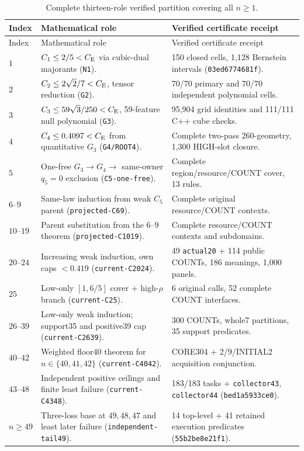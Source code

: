 \begin{center}\small
\begin{longtable}{@{}P{0.10\textwidth}P{0.44\textwidth}P{0.38\textwidth}@{}}
\caption{Complete thirteen-role verified partition covering all $n\ge1$.}
\label{ms:tab:roles}\\\toprule
Index & Mathematical role & Verified certificate receipt\\\midrule
\endfirsthead\toprule
Index & Mathematical role & Verified certificate receipt\\\midrule\endhead
$1$ & $C_1\le2/5<C_{\mathrm E}$ via cubic-dual majorants (\texttt{N1}). & 150 closed cells, 1,128 Bernstein intervals (\texttt{03ed6774681f}).\\
$2$ & $C_2\le2\sqrt2/7<C_{\mathrm E}$, tensor reduction (\texttt{G2}). & 70/70 primary and 70/70 independent polynomial cells.\\
$3$ & $C_3\le59\sqrt3/250<C_{\mathrm E}$, 59-feature null polynomial (\texttt{G3}). & 95,904 grid identities and 111/111 C++ cube checks.\\
$4$ & $C_4\le0.4097<C_{\mathrm E}$ from quantitative $G_3$ (\texttt{G4/ROOT4}). & Complete two-pass 260-geometry, 1,300 HIGH-slot closure.\\
$5$ & One-free $G_3\to G_4\to$ same-owner $q_5=0$ exclusion (\texttt{C5-one-free}). & Complete region/resource/COUNT cover, 13 rules.\\
$6$--$9$ & Same-law induction from weak $C_5$ parent (\texttt{projected-C69}). & Complete original resource/COUNT contexts.\\
$10$--$19$ & Parent substitution from the $6$--$9$ theorem (\texttt{projected-C1019}). & Complete resource/COUNT contexts and subdomains.\\
$20$--$24$ & Increasing weak induction, own caps $<0.419$ (\texttt{current-C2024}). & 49 \texttt{actual20} + 114 public COUNTs, 186 meanings, 1,000 panels.\\
$25$ & Low-only $[1,6/5]$ cover + high-$\rho$ branch (\texttt{current-C25}). & 6 original calls, 52 complete COUNT interfaces.\\
$26$--$39$ & Low-only weak induction; support35 and positive39 cap (\texttt{current-C2639}). & 300 COUNTs, whole7 partitions, 35 support predicates.\\
$40$--$42$ & Weighted floor40 theorem for $n\in\{40,41,42\}$ (\texttt{current-C4042}). & CORE304 + 2/9/INITIAL2 acquisition conjunction.\\
$43$--$48$ & Independent positive ceilings and finite least failure (\texttt{current-C4348}). & 183/183 tasks + \texttt{collector43}, \texttt{collector44} (\texttt{bed1a5933ce0}).\\
$n\ge49$ & Three-loss base at $49,48,47$ and least later failure (\texttt{independent-tail49}). & 14 top-level + 41 retained execution predicates (\texttt{55b2be8e21f1}).\\\bottomrule
\end{longtable}
\end{center}

